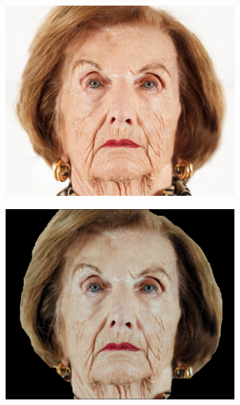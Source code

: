\begin{figure}[H]
\centering

\begin{subfigure}{.25\textwidth}
  \centering
  \includegraphics[width=0.95\textwidth]{img/fd3/fail1_input.jpg}
  \caption{}
\end{subfigure}%
\begin{subfigure}{.25\textwidth}
  \centering
  \includegraphics[width=0.95\textwidth]{img/fd3/fail1_faceImage.png}
  \caption{}
\end{subfigure}%
\begin{subfigure}{.25\textwidth}
  \centering

\end{subfigure}
\end{figure}
